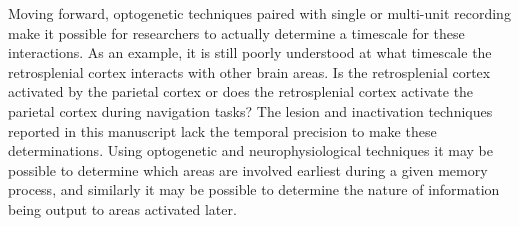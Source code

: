 \documentclass[doc, longtable]{apa6}
\begin{document}
Moving forward, optogenetic techniques paired with single or multi-unit recording make it possible for researchers to actually determine a timescale for these interactions. As an example, it is still poorly understood at what timescale the retrosplenial cortex interacts with other brain areas. Is the retrosplenial cortex activated by the parietal cortex or does the retrosplenial cortex activate the parietal cortex during navigation tasks? The lesion and inactivation techniques reported in this manuscript lack the temporal precision to make these determinations. Using optogenetic and neurophysiological techniques it may be possible to determine which areas are involved earliest during a given memory process, and similarly it may be possible to determine the nature of information being output to areas activated later.
\end{document}
